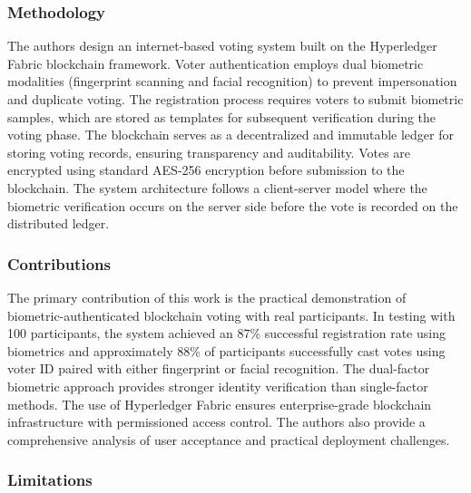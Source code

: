 \subsubsection{Methodology}
\label{subsubsec:faruk-method}

The authors design an internet-based voting system built on the Hyperledger Fabric blockchain framework. Voter authentication employs dual biometric modalities (fingerprint scanning and facial recognition) to prevent impersonation and duplicate voting. The registration process requires voters to submit biometric samples, which are stored as templates for subsequent verification during the voting phase. The blockchain serves as a decentralized and immutable ledger for storing voting records, ensuring transparency and auditability. Votes are encrypted using standard AES-256 encryption before submission to the blockchain. The system architecture follows a client-server model where the biometric verification occurs on the server side before the vote is recorded on the distributed ledger.

\subsubsection{Contributions}
\label{subsubsec:faruk-contrib}

The primary contribution of this work is the practical demonstration of biometric-authenticated blockchain voting with real participants. In testing with 100 participants, the system achieved an 87\% successful registration rate using biometrics and approximately 88\% of participants successfully cast votes using voter ID paired with either fingerprint or facial recognition. The dual-factor biometric approach provides stronger identity verification than single-factor methods. The use of Hyperledger Fabric ensures enterprise-grade blockchain infrastructure with permissioned access control. The authors also provide a comprehensive analysis of user acceptance and practical deployment challenges.

\subsubsection{Limitations}
\label{subsubsec:faruk-limits}

